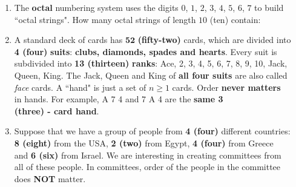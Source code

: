 \documentclass[letterpaper,12pt]{article}
\begin{document}
\begin{enumerate}[label=(\alph*)]
		\item The {\bf octal} numbering system uses the digits $0$, $1$, $2$, $3$, $4$, $5$, $6$, $7$ to build  \\ ``octal strings". How many octal strings of length $10$ (ten) contain:
	\begin{enumerate}[label=(\roman*)] 
		\setlength\itemsep{0.6em}
	\end{enumerate} 
	\item A standard deck of cards has $\mathbf{52}$ \textbf{(fifty-two)} cards, which are divided into \\ \textbf{4 (four)} \textbf{suits}:\textbf{ clubs, diamonds, spades and hearts}. Every suit is \\  subdivided into \textbf{13 (thirteen)} \textbf{ranks}: Ace, 2, 3, 4, 5, 6, 7, 8, 9, 10, Jack, \\  Queen, King. The Jack, Queen and King of {\bf all four suits} are also called \\ {\em face} cards. A ``hand" is just a set of $n\geq 1$ cards. Order {\bf never matters} \\ in hands. For example, A\spd{} 7\spd{}  4\clb{} and 7\spd{} A\spd{} 4\clb{} are the \textbf{same 3} \\ \textbf{ (three) - card hand}.
	\begin{enumerate}[label=(\roman*)]
	\end{enumerate}
	\item Suppose that we have a group of people from \textbf{4 (four)} different countries: \\ \textbf{8 (eight)} from the USA, \textbf{2 (two)} from Egypt, \textbf{4 (four)} from Greece \\ and \textbf{6 (six)} from Israel. We are interesting in creating committees from \\ all of these people. In committees, order of the people in the committee \\ does {\bf NOT} matter.

\end{enumerate}
\end{document}
